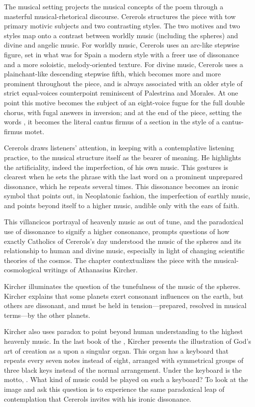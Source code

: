 \documentclass[tt]{vcbook-proposal}
\begin{document}
The musical setting projects the musical concepts of the poem through a masterful musical-rhetorical discourse.
Cererols structures the piece with tow primary motivic subjects and two contrasting styles.
The two motives and two styles map onto a contrast between worldly music (including the spheres) and divine and angelic music. 
For worldly music, Cererols uses an arc-like stepwise figure, set in what was for Spain a modern style with a freer use of dissonance and a more soloistic, melody-oriented texture.
For divine music, Cererols uses a plainchant-like descending stepwise fifth, which becomes more and more prominent throughout the piece, and is always associated with an older style of strict equal-voices counterpoint reminiscent of Palestrina and Morales.
At one point this motive becomes the subject of an eight-voice fugue for the full double chorus, with fugal answers in inversion; and at the end of the piece, setting the words , it becomes the literal cantus firmus of a section in the style of a cantus-firmus motet.

Cererols draws listeners' attention, in keeping with a contemplative listening practice, to the musical structure itself as the bearer of meaning.
He highlights the artificiality, indeed the imperfection, of his own music.
This gestures is clearest when he sets the phrase  with the last word on a prominent unprepared dissonance, which he repeats several times.
This dissonance becomes an ironic symbol that points out, in Neoplatonic fashion, the imperfection of earthly music, and points beyond itself to a higher music, audible only with the ears of faith.

This villancicos portrayal of heavenly music as out of tune, and the paradoxical use of dissonance to signify a higher consonance, prompts questions of how exactly Catholics of Cererols's day understood the music of the spheres and its relationship to human and divine music, especially in light of changing scientific theories of the cosmos.
The chapter contextualizes the piece with the musical-cosmological writings of Athanasius Kircher.

Kircher illuminates the question of the tunefulness of the music of the spheres.
Kircher explains that some planets exert consonant influences on the earth, but others are dissonant, and must be held in tension---prepared, resolved in musical terms---by the other planets. 

Kircher also uses paradox to point beyond human understanding to the highest heavenly music. 
In the last book of the , Kircher presents the illustration of God's art of creation as a  upon a singular organ.
This organ has a keyboard that repeats every seven notes instead of eight, arranged with symmetrical groups of three black keys instead of the normal arrangement.
Under the keyboard is the motto, . 
What kind of music could be played on such a keyboard?
To look at the image and ask this question is to experience the same paradoxical leap of contemplation that Cererols invites with his ironic dissonance.
\end{document}
